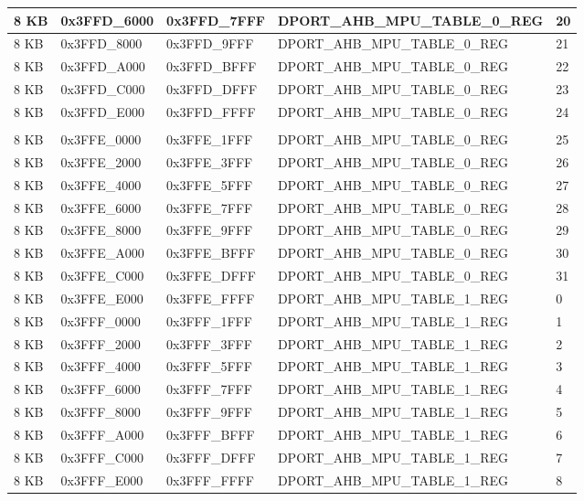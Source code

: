 \begin{longtable}[h]{|p{1.5cm}|p{3cm}|p{3cm}|p{6cm}|p{1.5cm}|}
    \hline
    8 KB & 0x3FFD\_6000 & 0x3FFD\_7FFF & DPORT\_AHB\_MPU\_TABLE\_0\_REG & 20 \\
    \hline
    8 KB & 0x3FFD\_8000 & 0x3FFD\_9FFF & DPORT\_AHB\_MPU\_TABLE\_0\_REG & 21 \\
    \hline
    8 KB & 0x3FFD\_A000 & 0x3FFD\_BFFF & DPORT\_AHB\_MPU\_TABLE\_0\_REG & 22 \\
    \hline
    8 KB & 0x3FFD\_C000 & 0x3FFD\_DFFF & DPORT\_AHB\_MPU\_TABLE\_0\_REG & 23 \\
    \hline
    8 KB & 0x3FFD\_E000 & 0x3FFD\_FFFF & DPORT\_AHB\_MPU\_TABLE\_0\_REG & 24 \\
    \hline
    
    \rowcolor{gray!25}
    \multicolumn{5}{|c|}{Internal SRAM 1} \\
    \hline
    8 KB & 0x3FFE\_0000 & 0x3FFE\_1FFF & DPORT\_AHB\_MPU\_TABLE\_0\_REG & 25 \\
    \hline
    8 KB & 0x3FFE\_2000 & 0x3FFE\_3FFF & DPORT\_AHB\_MPU\_TABLE\_0\_REG & 26 \\
    \hline
    8 KB & 0x3FFE\_4000 & 0x3FFE\_5FFF & DPORT\_AHB\_MPU\_TABLE\_0\_REG & 27 \\
    \hline
    8 KB & 0x3FFE\_6000 & 0x3FFE\_7FFF & DPORT\_AHB\_MPU\_TABLE\_0\_REG & 28 \\
    \hline
    8 KB & 0x3FFE\_8000 & 0x3FFE\_9FFF & DPORT\_AHB\_MPU\_TABLE\_0\_REG & 29 \\
    \hline
    8 KB & 0x3FFE\_A000 & 0x3FFE\_BFFF & DPORT\_AHB\_MPU\_TABLE\_0\_REG & 30 \\
    \hline
    8 KB & 0x3FFE\_C000 & 0x3FFE\_DFFF & DPORT\_AHB\_MPU\_TABLE\_0\_REG & 31 \\
    \hline
    8 KB & 0x3FFE\_E000 & 0x3FFE\_FFFF & DPORT\_AHB\_MPU\_TABLE\_1\_REG & 0 \\
    \hline
    8 KB & 0x3FFF\_0000 & 0x3FFF\_1FFF & DPORT\_AHB\_MPU\_TABLE\_1\_REG & 1 \\
    \hline
    8 KB & 0x3FFF\_2000 & 0x3FFF\_3FFF & DPORT\_AHB\_MPU\_TABLE\_1\_REG & 2 \\
    \hline
    8 KB & 0x3FFF\_4000 & 0x3FFF\_5FFF & DPORT\_AHB\_MPU\_TABLE\_1\_REG & 3 \\
    \hline
    8 KB & 0x3FFF\_6000 & 0x3FFF\_7FFF & DPORT\_AHB\_MPU\_TABLE\_1\_REG & 4 \\
    \hline
    8 KB & 0x3FFF\_8000 & 0x3FFF\_9FFF & DPORT\_AHB\_MPU\_TABLE\_1\_REG & 5 \\
    \hline
    8 KB & 0x3FFF\_A000 & 0x3FFF\_BFFF & DPORT\_AHB\_MPU\_TABLE\_1\_REG & 6 \\
    \hline
    8 KB & 0x3FFF\_C000 & 0x3FFF\_DFFF & DPORT\_AHB\_MPU\_TABLE\_1\_REG & 7 \\
    \hline
    8 KB & 0x3FFF\_E000 & 0x3FFF\_FFFF & DPORT\_AHB\_MPU\_TABLE\_1\_REG & 8 \\
    
\end{longtable}
